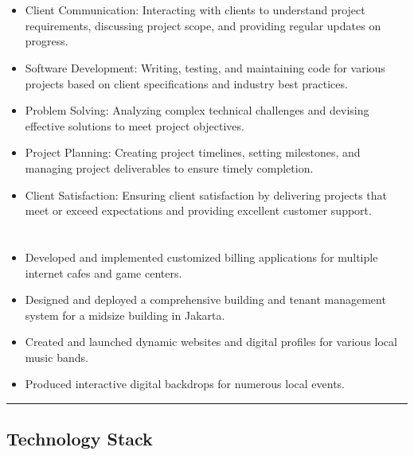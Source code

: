 \documentclass[12pt]{res}
\begin{document}
\begin{resume}
\begin{multicols}{2}
	\section{}
		\begin{itemize}
			\item Client Communication: Interacting with clients to understand project requirements, discussing project scope, and providing regular updates on progress.
\item Software Development: Writing, testing, and maintaining code for various projects based on client specifications and industry best practices.
\item Problem Solving: Analyzing complex technical challenges and devising effective solutions to meet project objectives.
\item Project Planning: Creating project timelines, setting milestones, and managing project deliverables to ensure timely completion.
\item Client Satisfaction: Ensuring client satisfaction by delivering projects that meet or exceed expectations and providing excellent customer support.
		\end{itemize}
	\section{}
		\begin{itemize}
			\setlength{\itemindent}{0pt}
			\item Developed and implemented customized billing applications for multiple internet cafes and game centers.
\item Designed and deployed a comprehensive building and tenant management system for a midsize building in Jakarta.
\item Created and launched dynamic websites and digital profiles for various local music bands.
\item Produced interactive digital backdrops for numerous local events.
		\end{itemize}
\end{multicols}

\vspace{-20pt}
\begin{minipage}[t]{0.55\linewidth}
	\rule{0.25\textwidth}{2pt}
	\begin{multicols}{2}
		\section{Technology Stack}
		\columnbreak

\end{multicols}
\end{minipage}
\end{resume}
\end{document}
